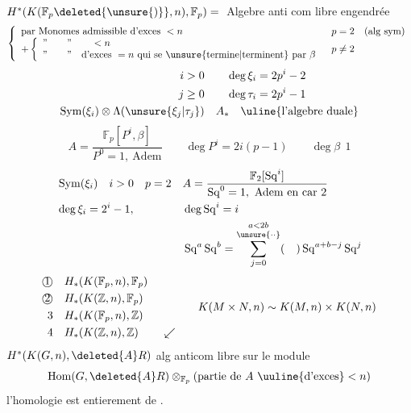 
$H^*(K(\mathbb F_p\deleted{\unsure{)}},n),\mathbb F_p)={}$ Algebre anti com libre engendrée
\[
\left\{\begin{array}{ll}
\text{par Monomes admissible d'exces }<n & p=2\quad(\text{alg sym})\\
+\left\{\begin{array}{l}\text{''}\qquad\text{''}\qquad <n\\
\text{''}\qquad\text{''}\quad\text{d'exces }=n\ \text{qui se \unsure{termine|terminent} par }\beta
\end{array}\right. &p\ne2
\end{array}\right.
\]
\[
\begin{aligned}
i>0&\qquad\deg\xi_i=2p^i-2\\
j\geq0&\qquad\deg\tau_i=2p^i-1\\
\operatorname{Sym}(\xi_i)\otimes\Lambda(\unsure{\xi_j|\tau_j})&\quad A_*\quad\text{\uline{l'algebre duale}}
\end{aligned}
\]
\[
A=\frac{\mathbb F_p[P^i,\beta]}{P^0=1,\ \text{Adem}}
\qquad \deg P^i=2i(p-1)\qquad\deg\beta\ \ 1
\]
\[
\begin{aligned}
&\operatorname{Sym}(\xi_i)\quad i>0\quad p=2&&A=\frac{\mathbb F_2[\operatorname{Sq}^i]}{\operatorname{Sq}^0=1,\ \text{Adem en car }2}\\
&\deg\xi_i=2^i-1,&&\deg\operatorname{Sq}^i=i\\
&&&\operatorname{Sq}^a\operatorname{Sq}^b
=\overset{a<2b}{\sum_{j=0}^{\unsure{\cdot\cdot}}}(\quad)\operatorname{Sq}^{a+b-j}\operatorname{Sq}^j
\end{aligned}
\]
\[
\begin{aligned}
\text{\textcircled{1}}\quad&H_{*}(K(\mathbb F_p,n),\mathbb F_p)\\
\text{\textcircled{2}}\quad&H_{*}(K(\mathbb Z,n),\mathbb F_p)\\
3\quad&H_{*}(K(\mathbb F_p,n),\mathbb Z)\\
4\quad&H_{*}(K(\mathbb Z,n),\mathbb Z)\qquad\swarrow
\end{aligned}
\qquad K(M\times N,n)\sim K(M,n)\times K(N,n)
\]
$H^*(K(G,n),\deleted{A}R)$ alg anticom libre sur le module 
\[
\operatorname{Hom}(G,\deleted{A}R)\otimes_{\mathbb F_p}(\text{partie de } A\ \text{\uuline{d'exces}}<n)
\]
l'homologie est entierement de .

